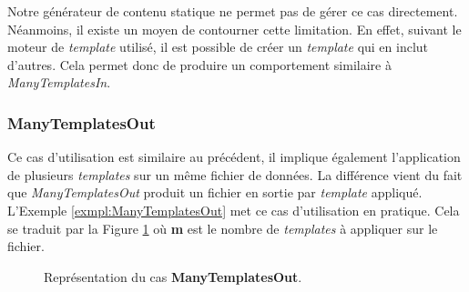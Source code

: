 			\begin{note}
				Notre générateur de contenu statique ne permet pas de gérer ce cas directement. Néanmoins, il existe un moyen de contourner cette limitation. En effet, suivant le moteur de \textit{template} utilisé, il est possible de créer un \textit{template} qui en inclut d'autres. Cela permet donc de produire un comportement similaire à \textit{ManyTemplatesIn}.
			\end{note}
			
		
		\subsubsection*{ManyTemplatesOut}
		
			Ce cas d'utilisation est similaire au précédent, il implique également l'application de plusieurs \textit{templates} sur un même fichier de données. La différence vient du fait que \textit{ManyTemplatesOut} produit un fichier en sortie par \textit{template} appliqué. L'Exemple \ref{exmpl:ManyTemplatesOut} met ce cas d'utilisation en pratique. Cela se traduit par la Figure \ref{fig:ManyTemplatesOut} où \textbf{m} est le nombre de \textit{templates} à appliquer sur le fichier.
			
			\begin{figure}[b]
				\begin{center}
					\caption{Représentation du cas \textbf{ManyTemplatesOut}.}
					\label{fig:ManyTemplatesOut}
				\end{center}
			\end{figure}
			
			\newpage
			
